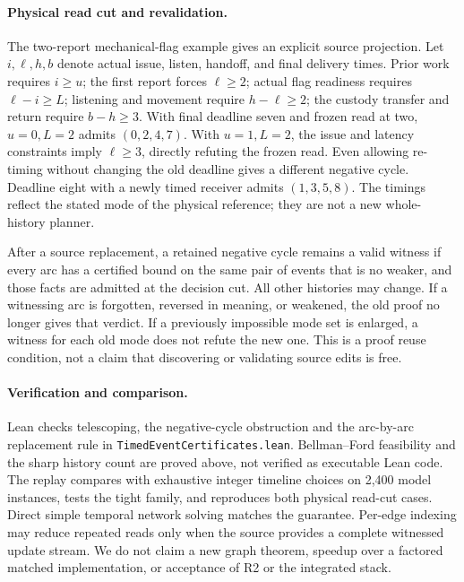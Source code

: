 \documentclass[11pt]{article}
\begin{document}
\paragraph{Physical read cut and revalidation.}
The two-report mechanical-flag example gives an explicit source
projection. Let \(i,\ell,h,b\) denote actual issue, listen, handoff,
and final delivery times. Prior work requires \(i\geq u\);
the first report forces \(\ell\geq2\); actual flag readiness requires
\(\ell-i\geq L\); listening and movement require \(h-\ell\geq2\);
the custody transfer and return require \(b-h\geq3\).
With final deadline seven and frozen read at two, \(u=0,L=2\)
admits \((0,2,4,7)\). With \(u=1,L=2\), the issue and latency
constraints imply \(\ell\geq3\), directly refuting the frozen read.
Even allowing re-timing without changing the old deadline gives a
different negative cycle. Deadline eight with a newly timed receiver
admits \((1,3,5,8)\). The timings reflect the stated mode of the
physical reference; they are not a new whole-history planner.

After a source replacement, a retained negative cycle remains a
valid witness if every arc has a certified bound on the same pair
of events that is no weaker, and those facts are admitted at the
decision cut. All other histories may change. If a witnessing arc
is forgotten, reversed in meaning, or weakened, the old proof
no longer gives that verdict. If a previously impossible mode set
is enlarged, a witness for each old mode does not refute the new one.
This is a proof reuse condition, not a claim that discovering or
validating source edits is free.

\paragraph{Verification and comparison.}
Lean checks telescoping, the negative-cycle obstruction and the
arc-by-arc replacement rule in \texttt{TimedEventCertificates.lean}.
Bellman--Ford feasibility and the sharp history count are proved
above, not verified as executable Lean code. The replay compares
with exhaustive integer timeline choices on 2,400 model instances,
tests the tight family, and reproduces both physical read-cut cases.
Direct simple temporal network solving matches the guarantee.
Per-edge indexing may reduce repeated reads only when the source
provides a complete witnessed update stream. We do not claim a
new graph theorem, speedup over a factored matched implementation,
or acceptance of R2 or the integrated stack.
\end{document}
